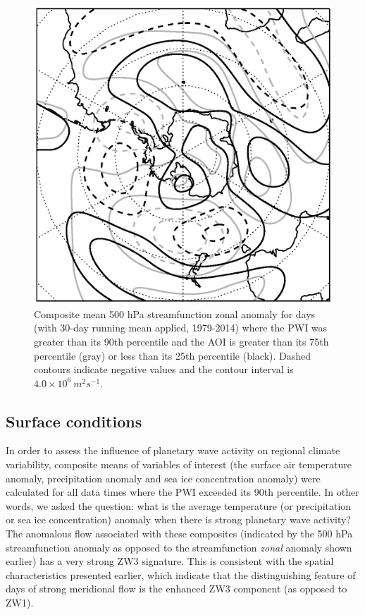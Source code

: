 \begin{figure}
\begin{center}
\includegraphics[width=0.56\columnwidth]{figures/zonalwaves/sf-composite_samgt75pct-samlt25pct-pwigt90pct_ERAInterim_500hPa_030day-runmean_native-zonal-anom-shextropics15.eps}
\caption{\label{fig:sam_composite}
Composite mean 500 hPa streamfunction zonal anomaly for days (with 30-day running mean applied, 1979-2014) where the PWI was greater than its 90th percentile and the AOI is greater than its 75th percentile (gray) or less than its 25th percentile (black). Dashed contours indicate negative values and the contour interval is $4.0 \times 10^6 \: m^2 s^{-1}$.}
\end{center}
\end{figure}


\subsection{Surface conditions}\label{s:surface_conditions}

In order to assess the influence of planetary wave activity on regional climate variability, composite means of variables of interest (the surface air temperature anomaly, precipitation anomaly and sea ice concentration anomaly) were calculated for all data times where the PWI exceeded its 90th percentile. In other words, we asked the question: what is the average temperature (or precipitation or sea ice concentration) anomaly when there is strong planetary wave activity? The anomalous flow associated with these composites (indicated by the 500 hPa streamfunction anomaly as opposed to the streamfunction \textit{zonal} anomaly shown earlier) has a very strong ZW3 signature. This is consistent with the spatial characteristics presented earlier, which indicate that the distinguishing feature of days of strong meridional flow is the enhanced ZW3 component (as opposed to ZW1).  


